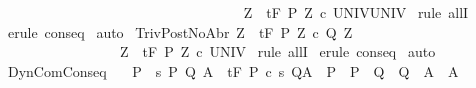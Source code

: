 \begin{isabellebody}
\ \ \ \ \ \ \ \ \ \ \ \ \ \ \ \ \ {\isasymLongrightarrow}\isanewline
\ \ \ \ \ \ \ \ \ \ \ \ \ \ \ \ \ {\isasymforall}Z{\isachardot}\ {\isasymGamma}{\isacharcomma}{\isasymTheta}\ {\isasymturnstile}\isactrlsub t\isactrlbsub {\isacharslash}F\isactrlesub \ {\isacharparenleft}P{\isacharprime}\ Z{\isacharparenright}\ c\ UNIV{\isacharcomma}UNIV{\isachardoublequoteclose}\isanewline
%
\isadelimproof
%
\endisadelimproof
%
\isatagproof
{}\isamarkupfalse%
\ {\isacharparenleft}rule\ allI{\isacharparenright}\isanewline
{}\isamarkupfalse%
\ {\isacharparenleft}erule\ conseq{\isacharparenright}\isanewline
{}\isamarkupfalse%
\ auto\isanewline
{}\isamarkupfalse%
%
\endisatagproof
{\isafoldproof}%
%
\isadelimproof
\isanewline
%
\endisadelimproof
\isanewline
{}\isamarkupfalse%
\ TrivPostNoAbr{\isacharcolon}\ {\isachardoublequoteopen}{\isasymforall}Z{\isachardot}\ {\isasymGamma}{\isacharcomma}{\isasymTheta}\ {\isasymturnstile}\isactrlsub t\isactrlbsub {\isacharslash}F\isactrlesub \ {\isacharparenleft}P{\isacharprime}\ Z{\isacharparenright}\ c\ {\isacharparenleft}Q{\isacharprime}\ Z{\isacharparenright}{\isacharcomma}{\isacharbraceleft}{\isacharbraceright}\isanewline
\ \ \ \ \ \ \ \ \ \ \ \ \ \ \ \ \ {\isasymLongrightarrow}\isanewline
\ \ \ \ \ \ \ \ \ \ \ \ \ \ \ \ \ {\isasymforall}Z{\isachardot}\ {\isasymGamma}{\isacharcomma}{\isasymTheta}\ {\isasymturnstile}\isactrlsub t\isactrlbsub {\isacharslash}F\isactrlesub \ {\isacharparenleft}P{\isacharprime}\ Z{\isacharparenright}\ c\ UNIV{\isacharcomma}{\isacharbraceleft}{\isacharbraceright}{\isachardoublequoteclose}\isanewline
%
\isadelimproof
%
\endisadelimproof
%
\isatagproof
{}\isamarkupfalse%
\ {\isacharparenleft}rule\ allI{\isacharparenright}\isanewline
{}\isamarkupfalse%
\ {\isacharparenleft}erule\ conseq{\isacharparenright}\isanewline
{}\isamarkupfalse%
\ auto\isanewline
{}\isamarkupfalse%
%
\endisatagproof
{\isafoldproof}%
%
\isadelimproof
\isanewline
%
\endisadelimproof
\isanewline
{}\isamarkupfalse%
\ DynComConseq{\isacharcolon}\isanewline
\ \ \ {\isachardoublequoteopen}P\ {\isasymsubseteq}\ {\isacharbraceleft}s{\isachardot}\ {\isasymexists}P{\isacharprime}\ Q{\isacharprime}\ A{\isacharprime}{\isachardot}\ \ {\isasymGamma}{\isacharcomma}{\isasymTheta}{\isasymturnstile}\isactrlsub t\isactrlbsub {\isacharslash}F\ \isactrlesub P{\isacharprime}\ {\isacharparenleft}c\ s{\isacharparenright}\ Q{\isacharprime}{\isacharcomma}A{\isacharprime}\ {\isasymand}\ P\ {\isasymsubseteq}\ P{\isacharprime}\ {\isasymand}\ Q{\isacharprime}\ {\isasymsubseteq}\ Q\ {\isasymand}\ A{\isacharprime}\ {\isasymsubseteq}\ A{\isacharbraceright}{\isachardoublequoteclose}\ \isanewline

\end{isabellebody}
